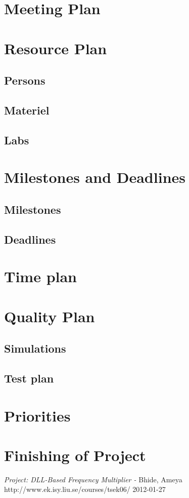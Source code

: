 \documentclass[a4paper,12pt]{article}
\begin{document}
\section{Meeting Plan}

\section{Resource Plan}
\subsection{Persons}
\subsection{Materiel}
\subsection{Labs}

\section{Milestones and Deadlines}
\subsection{Milestones}
\subsection{Deadlines}

\section{Time plan}

\section{Quality Plan}
\subsection{Simulations}
\subsection{Test plan}

\section{Priorities}

\section{Finishing of Project}

\newpage
\appendix

\newpage


\begin{thebibliography}{99}
\textit{Project: DLL-Based Frequency Multiplier - } Bhide, Ameya
\\ http://www.ek.isy.liu.se/courses/tsek06/ 2012-01-27
\end{thebibliography}
\end{document}
